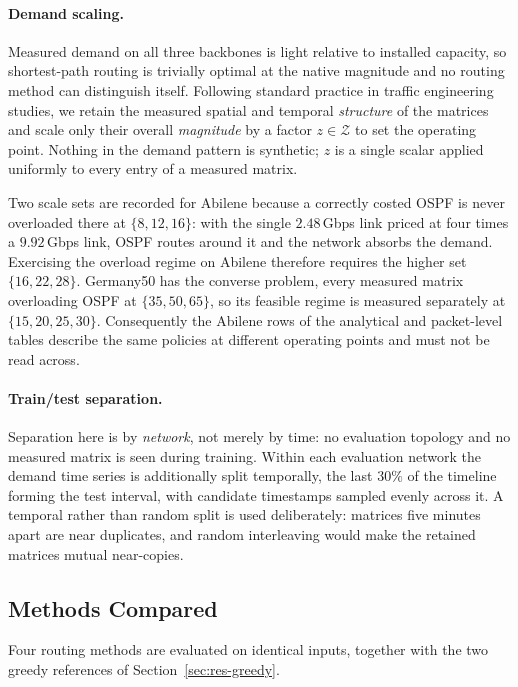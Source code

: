 \paragraph{Demand scaling.}
\label{sec:setup-scaling}
Measured demand on all three backbones is light relative to installed capacity,
so shortest-path routing is trivially optimal at the native magnitude and no
routing method can distinguish itself. Following standard practice in traffic
engineering studies, we retain the measured spatial and temporal \emph{structure}
of the matrices and scale only their overall \emph{magnitude} by a factor
$z\in\mathcal{Z}$ to set the operating point. Nothing in the demand pattern is
synthetic; $z$ is a single scalar applied uniformly to every entry of a measured
matrix.

Two scale sets are recorded for Abilene because a correctly costed OSPF is never
overloaded there at $\{8,12,16\}$: with the single $2.48$\,Gbps link priced at
four times a $9.92$\,Gbps link, OSPF routes around it and the network absorbs the
demand. Exercising the overload regime on Abilene therefore requires the higher
set $\{16,22,28\}$. Germany50 has the converse problem, every measured matrix
overloading OSPF at $\{35,50,65\}$, so its feasible regime is measured separately
at $\{15,20,25,30\}$. Consequently the Abilene rows of the analytical and
packet-level tables describe the same policies at different operating points and
must not be read across.

\paragraph{Train/test separation.}
Separation here is by \emph{network}, not merely by time: no evaluation topology
and no measured matrix is seen during training. Within each evaluation network the
demand time series is additionally split temporally, the last $30\%$ of the
timeline forming the test interval, with candidate timestamps sampled evenly
across it. A temporal rather than random split is used deliberately: matrices five
minutes apart are near duplicates, and random interleaving would make the retained
matrices mutual near-copies.

\subsection{Methods Compared}
\label{sec:setup-methods}

Four routing methods are evaluated on identical inputs, together with the two greedy references of Section~\ref{sec:res-greedy}.

